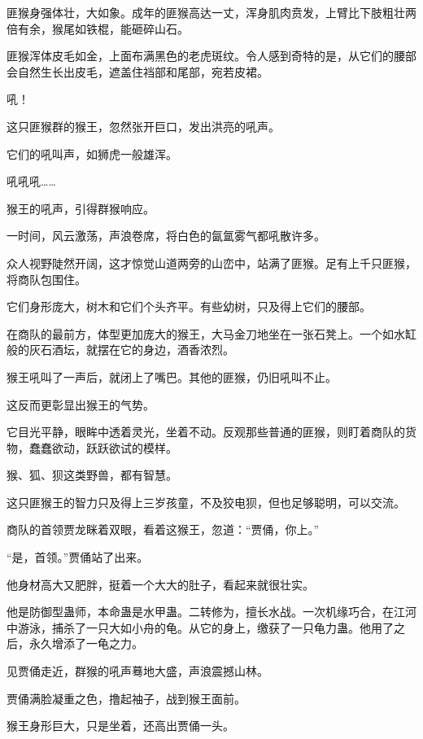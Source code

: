 
\begin{this_body}

匪猴身强体壮，大如象。成年的匪猴高达一丈，浑身肌肉贲发，上臂比下肢粗壮两倍有余，猴尾如铁棍，能砸碎山石。

匪猴浑体皮毛如金，上面布满黑色的老虎斑纹。令人感到奇特的是，从它们的腰部会自然生长出皮毛，遮盖住裆部和尾部，宛若皮裙。

吼！

这只匪猴群的猴王，忽然张开巨口，发出洪亮的吼声。

它们的吼叫声，如狮虎一般雄浑。

吼吼吼……

猴王的吼声，引得群猴响应。

一时间，风云激荡，声浪卷席，将白色的氤氲雾气都吼散许多。

众人视野陡然开阔，这才惊觉山道两旁的山峦中，站满了匪猴。足有上千只匪猴，将商队包围住。

它们身形庞大，树木和它们个头齐平。有些幼树，只及得上它们的腰部。

在商队的最前方，体型更加庞大的猴王，大马金刀地坐在一张石凳上。一个如水缸般的灰石酒坛，就摆在它的身边，酒香浓烈。

猴王吼叫了一声后，就闭上了嘴巴。其他的匪猴，仍旧吼叫不止。

这反而更彰显出猴王的气势。

它目光平静，眼眸中透着灵光，坐着不动。反观那些普通的匪猴，则盯着商队的货物，蠢蠢欲动，跃跃欲试的模样。

猴、狐、狈这类野兽，都有智慧。

这只匪猴王的智力只及得上三岁孩童，不及狡电狈，但也足够聪明，可以交流。

商队的首领贾龙眯着双眼，看着这猴王，忽道：“贾俑，你上。”

“是，首领。”贾俑站了出来。

他身材高大又肥胖，挺着一个大大的肚子，看起来就很壮实。

他是防御型蛊师，本命蛊是水甲蛊。二转修为，擅长水战。一次机缘巧合，在江河中游泳，捕杀了一只大如小舟的龟。从它的身上，缴获了一只龟力蛊。他用了之后，永久增添了一龟之力。

见贾俑走近，群猴的吼声蓦地大盛，声浪震撼山林。

贾俑满脸凝重之色，撸起袖子，战到猴王面前。

猴王身形巨大，只是坐着，还高出贾俑一头。


\end{this_body}
